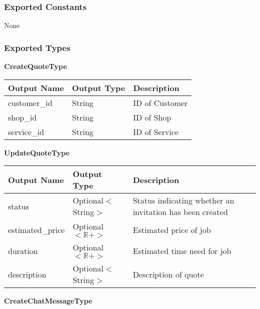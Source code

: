\documentclass[12pt, titlepage]{article}
\begin{document}
\subsubsection{Exported Constants}

None

\subsubsection{Exported Types}

\textbf{CreateQuoteType}

\begin{table}[H]
	\begin{tabular}{|p{}|p{}|p{}|}
		\hline
		\textbf{Output Name} & \textbf{Output Type} & \textbf{Description} \\
		\hline
		customer\_id         & String               & ID of Customer       \\
		\hline
		shop\_id             & String               & ID of Shop           \\
		\hline
		service\_id          & String               & ID of Service        \\
		\hline
	\end{tabular}
\end{table}

\textbf{UpdateQuoteType}

\begin{table}[H]
	\begin{tabular}{|p{}|p{}|p{}|}
		\hline
		\textbf{Output Name} & \textbf{Output Type}    & \textbf{Description}                                     \\
		\hline
		status               & Optional$<$String$>$    & Status indicating whether an invitation has been created \\
		\hline
		estimated\_price     & Optional$<\mathbb{R}+>$ & Estimated price of job                                   \\
		\hline
		duration             & Optional$<\mathbb{R}+>$ & Estimated time need for job                              \\
		\hline
		description          & Optional$<$String$>$    & Description of quote                                     \\
		\hline
	\end{tabular}
\end{table}

\textbf{CreateChatMessageType}
\end{document}
